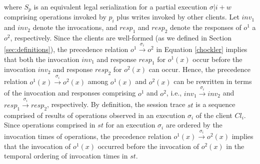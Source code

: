 \documentclass[journal,compsoc]{IEEEtran}
\begin{document}
 where ${S_p}$ is an equivalent legal serialization  for a partial execution  $\sigma |i + w$ comprising 
   operations invoked by $p_i$ plus writes invoked by other clients. %
 Let $\mathit{inv}_1$ and  $\mathit{inv}_2$ denote the invocations, and $\mathit{resp}_1$ and  $\mathit{resp}_2$ denote the responses  of  $\mathit{o}^1$ a $\mathit{o}^2$, respectively.  Since the clients are well-formed (as we defined in Section  \ref{sec:definitions}), the precedence relation  $\mathit{o}^1 \xrightarrow{\sigma_i} \mathit{o}^2$ %
   in   Equation \ref{chockler}  implies that  both the  invocation $\mathit{inv}_1$ and response $\mathit{resp}_1$   for $\mathit{o}^1(x)$ occur before the invocation $\mathit{inv}_2$ and response $\mathit{resp}_2$ for $\mathit{o}^2(x)$ can occur.  Hence, the precedence relation $ \mathit{o}^1(x) \xrightarrow{\sigma_i} \mathit{o}^2(x) $ among $\mathit{o}^1(x)$ and
 $\mathit{o}^2(x)$  can be rewritten in terms of the invocation and responses comprising  $\mathit{o}^1$ and
 $\mathit{o}^2$, i.e.,  $ \mathit{inv}_1 \xrightarrow{\sigma_i} \mathit{inv}_2 $ and $ \mathit{resp}_1 \xrightarrow{\sigma_i} \mathit{resp}_2 $, respectively. 
  By definition,  the session trace $\mathit{st}$ is a sequence comprised of results of operations observed in an execution $\sigma_i$ of the client $\mathit{Cl}_i$. Since operations comprised in $\mathit{st}$ for an execution $\sigma_i$ are ordered by the invocation times of  operations,  the precedence  relation $ \mathit{o}^1(x) \xrightarrow{\sigma_i} \mathit{o}^2(x) $ %
  implies that the invocation of $\mathit{o}^1(x)$ occurred before the invocation of $\mathit{o}^2(x)$ in the temporal ordering of invocation times in  $\mathit{st}$. %
\end{document}
